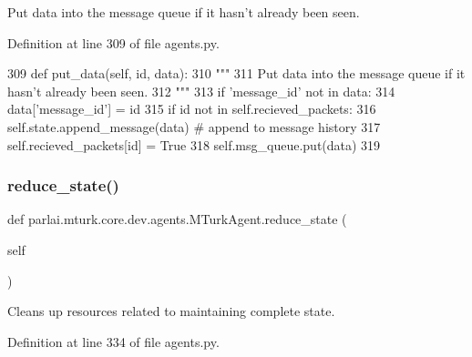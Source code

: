 \begin{DoxyVerb}Put data into the message queue if it hasn't already been seen.
\end{DoxyVerb}
 

Definition at line 309 of file agents.\+py.


\begin{DoxyCode}
309     \textcolor{keyword}{def }put\_data(self, id, data):
310         \textcolor{stringliteral}{"""}
311 \textcolor{stringliteral}{        Put data into the message queue if it hasn't already been seen.}
312 \textcolor{stringliteral}{        """}
313         \textcolor{keywordflow}{if} \textcolor{stringliteral}{'message\_id'} \textcolor{keywordflow}{not} \textcolor{keywordflow}{in} data:
314             data[\textcolor{stringliteral}{'message\_id'}] = id
315         \textcolor{keywordflow}{if} id \textcolor{keywordflow}{not} \textcolor{keywordflow}{in} self.recieved\_packets:
316             self.state.append\_message(data)  \textcolor{comment}{# append to message history}
317             self.recieved\_packets[id] = \textcolor{keyword}{True}
318             self.msg\_queue.put(data)
319 
\end{DoxyCode}
\mbox{\label{classparlai_1_1mturk_1_1core_1_1dev_1_1agents_1_1MTurkAgent_ade350517a74213389452642c625bc612}} 
\subsubsection{\texorpdfstring{reduce\+\_\+state()}{reduce\_state()}}
{\footnotesize\ttfamily def parlai.\+mturk.\+core.\+dev.\+agents.\+M\+Turk\+Agent.\+reduce\+\_\+state (\begin{DoxyParamCaption}\item[{}]{self }\end{DoxyParamCaption})}

\begin{DoxyVerb}Cleans up resources related to maintaining complete state.
\end{DoxyVerb}
 

Definition at line 334 of file agents.\+py.


